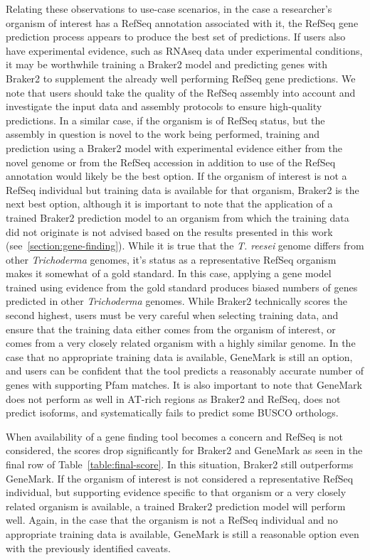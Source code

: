 Relating these observations to use-case scenarios, in the case a researcher's organism of interest has a RefSeq annotation associated with it,
the RefSeq gene prediction process appears to produce the best set of
predictions. If users also have experimental evidence, such as RNAseq
data under experimental conditions, it may be worthwhile training a
Braker2 model and predicting genes with Braker2 to supplement the
already well performing RefSeq gene predictions. We note that users should take the quality of the RefSeq assembly into account and investigate the input data and assembly protocols to ensure high-quality predictions. In a similar case, if
the organism is of RefSeq status, but the assembly in question is
novel to the work being performed, training and prediction using a
Braker2 model with experimental evidence either from the novel genome
or from the RefSeq accession in addition to use of the RefSeq
annotation would likely be the best option. If the organism of
interest is not a RefSeq individual but training data is available for
that organism, Braker2 is the next best option, although it is
important to note that the application of a trained Braker2 prediction
model to an organism from which the training data did not originate is
not advised based on the results presented in this work (see~\ref{section:gene-finding}). While it is true that the
\textit{T. reesei} genome differs from other \textit{Trichoderma}
genomes, it's status as a representative RefSeq organism makes it
somewhat of a gold standard. In this case, applying a gene model
trained using evidence from the gold standard produces biased numbers
of genes predicted in other \textit{Trichoderma} genomes. While
Braker2 technically scores the second highest, users must be very
careful when selecting training data, and ensure that the training
data either comes from the organism of interest, or comes from a very
closely related organism with a highly similar genome. In the case
that no appropriate training data is available, GeneMark is still an
option, and users can be confident that the tool predicts a reasonably
accurate number of genes with supporting Pfam matches. It is also
important to note that GeneMark does not perform as well in AT-rich
regions as Braker2 and RefSeq, does not predict isoforms, and
systematically fails to predict some BUSCO orthologs.

When availability of a gene finding tool becomes a concern and RefSeq
is not considered, the scores drop significantly for Braker2 and
GeneMark as seen in the final row of Table~\ref{table:final-score}. In
this situation, Braker2 still outperforms GeneMark. If the organism of
interest is not considered a representative RefSeq individual, but
supporting evidence specific to that organism or a very closely
related organism is available, a trained Braker2 prediction model will
perform well. Again, in the case that the organism is not a RefSeq
individual and no appropriate training data is available, GeneMark is
still a reasonable option even with the previously identified caveats.

